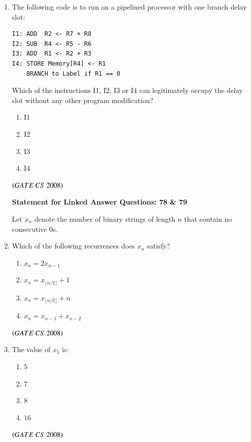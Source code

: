 \documentclass[journal, onecolumn]{IEEEtran}
\numberwithin{equation}{enumi}
\numberwithin{figure}{enumi}
\begin{document}
\begin{enumerate}
\item The following code is to run on a pipelined processor with one branch delay slot:  

\begin{verbatim}
I1: ADD  R2 <- R7 + R8
I2: SUB  R4 <- R5 - R6
I3: ADD  R1 <- R2 + R3
I4: STORE Memory[R4] <- R1
    BRANCH to Label if R1 == 0
\end{verbatim}

Which of the instructions I1, I2, I3 or I4 can legitimately occupy the delay slot without any other program modification?
\vspace{-1em}%
\begin{multicols}{4}
\begin{enumerate}
   \item I1
   \item I2  
   \item I3  
   \item I4  
\end{enumerate}
\end{multicols}
\hfill $\left(GATE\ CS\  2008\right)$

\begin{center}
\textbf{Statement for Linked Answer Questions: 78 \& 79}
\end{center}
\bigskip
Let $x_n$ denote the number of binary strings of length $n$ that contain no consecutive $0$s.

\item Which of the following recurrences does $x_n$ satisfy? 
\vspace{-1em}%
\begin{multicols}{4}
\begin{enumerate}
   \item $x_n = 2x_{n-1}$  
   \item $x_n = x_{\lfloor n/2 \rfloor} + 1$  
   \item $x_n = x_{\lfloor n/2 \rfloor} + n$  
   \item $x_n = x_{n-1} + x_{n-2}$  
\end{enumerate}
\end{multicols}
\hfill $\left(GATE\ CS\  2008\right)$

\item The value of $x_5$ is:
\vspace{-1em}%
\begin{multicols}{4}
\begin{enumerate}
   \item $5$  
   \item $7$  
   \item $8$  
   \item $16$  
\end{enumerate}
\end{multicols}
\hfill $\left(GATE\ CS\  2008\right)$


\end{enumerate}
\end{document}
